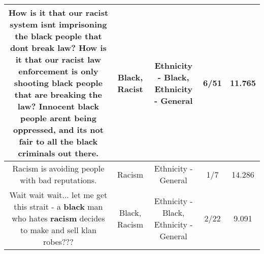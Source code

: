 \documentclass[11pt]{article}
\newlength\mylength
\begin{document}
\begin{center}
\begin{longtable}{|C{.65\mylength}|C{.30\mylength}|C{.12\mylength}|C{.12\mylength}|C{.12\mylength}|}
  \small How is it that our \textbf{racist} system isnt imprisoning the \textbf{black} people that dont break law? How is it that our \textbf{racist} law enforcement is only shooting \textbf{black} people that are breaking the law? Innocent \textbf{black} people arent being oppressed, and its not fair to all the \textbf{black} criminals out there.\normalsize   & Black, Racist & Ethnicity - Black, Ethnicity - General & 6/51 & 11.765 \\  \hline
  \small Racism is avoiding people with bad reputations.\normalsize   & Racism & Ethnicity - General & 1/7 & 14.286 \\  \hline
  \small Wait wait wait... let me get this strait - a \textbf{black} man who hates \textbf{racism} decides to make and sell klan robes???\normalsize   & Black, Racism & Ethnicity - Black, Ethnicity - General & 2/22 & 9.091 \\  \hline

\end{longtable}
\end{center}
\end{document}
